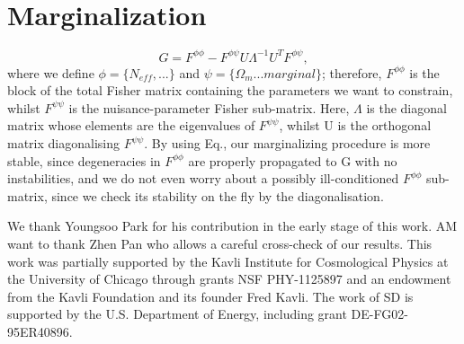 \documentclass[aps,prd,preprint,groupedaddress]{revtex4-1}
\begin{document}
\section{Marginalization}
\begin{equation}
G = F^{\phi\phi} - F^{\phi\psi}U\Lambda^{-1}U^{T}F^{\phi\psi},
\end{equation}
where we define $\phi = \{N_{eff},...\}$ and $\psi = \{\Omega_{m} ... marginal\}$; therefore, $F^{\phi\phi}$ is the block of the total Fisher matrix containing the parameters we want to constrain, whilst $F^{\psi\psi}$ is the nuisance-parameter Fisher sub-matrix. Here, $\Lambda$ is the diagonal matrix whose elements are the eigenvalues of $F^{\psi\psi}$, whilst U is the orthogonal matrix diagonalising $F^{\psi\psi}$. By using Eq., our marginalizing procedure is more stable, since degeneracies in $F^{\phi\phi}$ are properly propagated to G with no instabilities, and we do not even worry about a possibly ill-conditioned $F^{\phi\phi}$ sub-matrix, since we check its stability on the fly by the diagonalisation.

\begin{acknowledgments}
We thank Youngsoo Park for his contribution in the early stage of this work.
AM want to thank Zhen Pan who allows a careful cross-check of our results.
This work was partially supported by the Kavli Institute for Cosmological Physics at the University of Chicago through grants NSF PHY-1125897 and an endowment from the Kavli Foundation and its founder Fred Kavli.
The work of SD is supported by the U.S. Department of Energy, including grant DE-FG02-95ER40896.
\end{acknowledgments}


\end{document}
